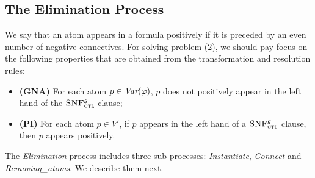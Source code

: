 \documentclass{article}
\begin{document}
\subsection{The Elimination Process}
We say that an atom appears in a formula positively if it is preceded by an even number of negative connectives.
For solving problem (2), we should pay focus on the following properties that are obtained from the transformation and resolution rules:
\begin{itemize}
  \item \textbf{(GNA)} For each atom $p \in  \textit{Var}(\varphi)$, $p$ does not positively appear in the left hand of the ${\textsc{SNF}_{\textsc{ctl}}^g}$ clause;
  \item \textbf{(PI)} For each atom $p\in V'$, if $p$ appears in the left hand of a ${\textsc{SNF}_{\textsc{ctl}}^g}$ clause, then $p$ appears positively.
\end{itemize}

The \emph{Elimination} process includes three sub-processes: \emph{Instantiate}, \emph{Connect} and \emph{Removing\_atoms}. We  describe them next.
\end{document}
